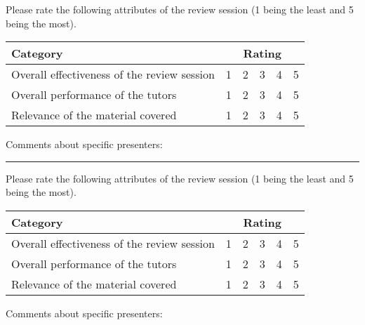 \documentclass[10pt]{article}
\begin{document}
Please rate the following attributes of the review session (1 being the
least and 5 being the most).

\vspace{0.5cm}
\begin{tabular}{ | l | c | c | c | c | c | }
  \hline
  \textbf{Category} & \multicolumn{5}{c|}{\textbf{Rating}} \\
  \hline
  Overall effectiveness of the review session & 1 & 2 & 3 & 4 & 5 \\
  \hline
  Overall performance of the tutors & 1 & 2 & 3 & 4 & 5 \\
  \hline
  Relevance of the material covered & 1 & 2 & 3 & 4 & 5 \\
  \hline
\end{tabular}

\vspace{1cm}
Comments about specific presenters:

\vspace{6.5cm}
\hrule
\vspace{0.5cm}
Please rate the following attributes of the review session (1 being the
least and 5 being the most).

\vspace{0.5cm}
\begin{tabular}{ | l | c | c | c | c | c | }
  \hline
  \textbf{Category} & \multicolumn{5}{c|}{\textbf{Rating}} \\
  \hline
  Overall effectiveness of the review session & 1 & 2 & 3 & 4 & 5 \\
  \hline
  Overall performance of the tutors & 1 & 2 & 3 & 4 & 5 \\
  \hline
  Relevance of the material covered & 1 & 2 & 3 & 4 & 5 \\
  \hline
\end{tabular}

\vspace{1cm}
Comments about specific presenters:
\end{document}

